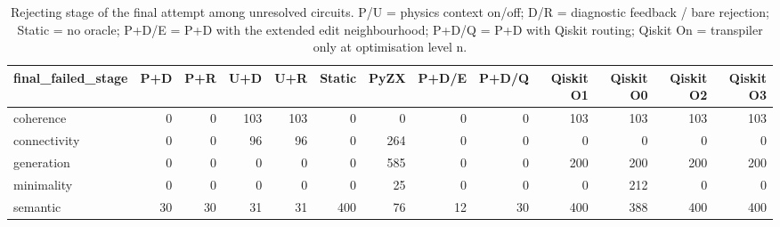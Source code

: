 \begin{table}[t]
\centering
\caption{Rejecting stage of the final attempt among unresolved circuits. P/U = physics context on/off; D/R = diagnostic feedback / bare rejection; Static = no oracle; P+D/E = P+D with the extended edit neighbourhood; P+D/Q = P+D with Qiskit routing; Qiskit On = transpiler only at optimisation level n.}
\label{tab:stages}
\footnotesize
\setlength{\tabcolsep}{3pt}
\begin{tabular}{lrrrrrrrrrrrr}
\toprule
final\_failed\_stage & P+D & P+R & U+D & U+R & Static & PyZX & P+D/E & P+D/Q & Qiskit O1 & Qiskit O0 & Qiskit O2 & Qiskit O3 \\
\midrule
coherence & 0 & 0 & 103 & 103 & 0 & 0 & 0 & 0 & 103 & 103 & 103 & 103 \\
connectivity & 0 & 0 & 96 & 96 & 0 & 264 & 0 & 0 & 0 & 0 & 0 & 0 \\
generation & 0 & 0 & 0 & 0 & 0 & 585 & 0 & 0 & 200 & 200 & 200 & 200 \\
minimality & 0 & 0 & 0 & 0 & 0 & 25 & 0 & 0 & 0 & 212 & 0 & 0 \\
semantic & 30 & 30 & 31 & 31 & 400 & 76 & 12 & 30 & 400 & 388 & 400 & 400 \\
\bottomrule
\end{tabular}
\end{table}

